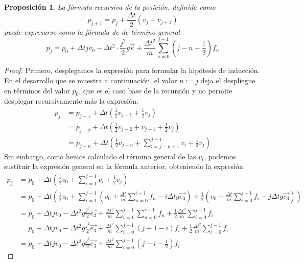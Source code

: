 \documentclass[10pt,a4paper]{article}
\newtheorem{proposicion}{Proposición}[section]
\begin{document}
\begin{proposicion}
\label{prop:p_k}
La fórmula recursiva de la posición, definida como
\[
p_{j+1} = p_{j} + \frac{\Delta t}{2}\left(v_j+v_{j+1}\right)
\]
puede expresarse como la fórmula de de término general
\[
p_j = p_0 + \Delta t j v_0 - \Delta t^2\cdot \frac{j^2}{2} g \vec{e} + \frac{\Delta t^2}{m} \sum_{n=0}^{j-1}\left(j - n - \frac{1}{2}\right) f_n
\]
\end{proposicion}
\begin{proof}
Primero, desplegamos la expresión para formular la hipótesis de inducción. En el desarrollo que se muestra a continuación, el valor $n := j$ deja el despliegue en términos del valor $p_0$, que es el caso base de la recursión y no permite desplegar recursivamente más la expresión.
\begin{align*}
p_{j} &= p_{j-1} +  \Delta t \left(\frac{1}{2} v_{j-1} + \frac{1}{2} v_j\right)  \\
	  &= p_{j-2} + \Delta t \left(\frac{1}{2}v_{j-2} + v_{j-1} + \frac{1}{2} v_j \right) \\
	  &= p_{j-n} + \Delta t \left(\frac{1}{2} v_{	j-n} + \sum_{i=j-n+1}^{j-1}v_i + \frac{1}{2} v_j \right)	  
\end{align*}
Sin embargo, como hemos calculado el término general de las $v_i$, podemos sustituir la expresión general en la fórmula anterior, obteniendo la expresión
\begin{align*}
p_j &= p_0 + \Delta t \left(\frac{1}{2} v_0 + \sum_{i = 1}^{j-1} v_i + \frac{1}{2} v_j \right) \\
	&= p_0 + \Delta t  \left(\frac{1}{2} v_0 + \sum_{i=1}^{j-1} \left(v_0 + \frac{\Delta t}{m} \sum_{n = 0}^{i-1} f_n - i \Delta t g \vec{e_3}\right) + \frac{1}{2}\left(v_0 + \frac{\Delta t}{m} \sum_{i = 0}^{j-1} f_i - j\Delta t g \vec{e_3}\right) \right) \\
	&= p_0 + \Delta t j v_0 - \Delta t^2 g \frac{j^2}{2} \vec{e_3} + \frac{\Delta t^2}{m} \sum_{i=1}^{j-1} \sum_{n=0}^{i-1}f_n + \frac{1}{2} \frac{\Delta t^2}{m} \sum_{i=0}^{j-1}f_i \\
	&= p_0 + \Delta t j v_0 - \Delta t^2 g \frac{j^2}{2} \vec{e_3} + \frac{\Delta t^2}{m} \sum_{i=0}^{j-1}(j-1-i) f_i + \frac{1}{2} \frac{\Delta t^2}{m} \sum_{i=0}^{j-1}f_i \\
	&= p_0 + \Delta t j v_0 - \Delta t^2 g \frac{j^2}{2} \vec{e_3} + \frac{\Delta t^2}{m} \sum_{i=0}^{j-1}\left(j-i-\frac{1}{2}\right) f_i
\end{align*}


\end{proof}
\end{document}
